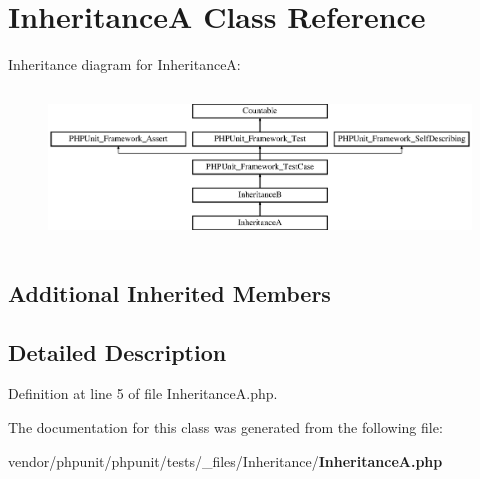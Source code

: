 \section{Inheritance\+A Class Reference}
\label{class_inheritance_a}
Inheritance diagram for Inheritance\+A\+:\begin{figure}[H]
\begin{center}
\leavevmode
\includegraphics[height=4.129793cm]{class_inheritance_a}
\end{center}
\end{figure}
\subsection*{Additional Inherited Members}


\subsection{Detailed Description}


Definition at line 5 of file Inheritance\+A.\+php.



The documentation for this class was generated from the following file\+:\begin{DoxyCompactItemize}
\item 
vendor/phpunit/phpunit/tests/\+\_\+files/\+Inheritance/{\bf Inheritance\+A.\+php}\end{DoxyCompactItemize}
